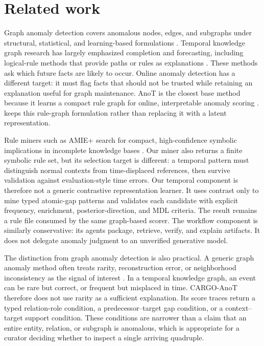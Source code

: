 \section{Related work}

Graph anomaly detection covers anomalous nodes, edges, and subgraphs under structural, statistical, and learning-based formulations \cite{Akoglu_2014}. Temporal knowledge graph research has largely emphasized completion and forecasting, including logical-rule methods that provide paths or rules as explanations \cite{Liu_2022,Cai_2023}. These methods ask which future facts are likely to occur. Online anomaly detection has a different target: it must flag facts that should not be trusted while retaining an explanation useful for graph maintenance. AnoT is the closest base method because it learns a compact rule graph for online, interpretable anomaly scoring \cite{Zhang_2024}. \method keeps this rule-graph formulation rather than replacing it with a latent representation.

Rule miners such as AMIE+ search for compact, high-confidence symbolic implications in incomplete knowledge bases \cite{Galarraga_2015}. Our miner also returns a finite symbolic rule set, but its selection target is different: a temporal pattern must distinguish normal contexts from time-displaced references, then survive validation against evaluation-style time errors. Our temporal component is therefore not a generic contrastive representation learner. It uses contrast only to mine typed atomic-gap patterns and validates each candidate with explicit frequency, enrichment, posterior-direction, and MDL criteria. The result remains a rule file consumed by the same graph-based scorer. The workflow component is similarly conservative: its agents package, retrieve, verify, and explain artifacts. It does not delegate anomaly judgment to an unverified generative model.

The distinction from graph anomaly detection is also practical. A generic graph anomaly method often treats rarity, reconstruction error, or neighborhood inconsistency as the signal of interest \cite{Akoglu_2014}. In a temporal knowledge graph, an event can be rare but correct, or frequent but misplaced in time. CARGO-AnoT therefore does not use rarity as a sufficient explanation. Its score traces return a typed relation-role condition, a predecessor--target gap condition, or a context--target support condition. These conditions are narrower than a claim that an entire entity, relation, or subgraph is anomalous, which is appropriate for a curator deciding whether to inspect a single arriving quadruple.

